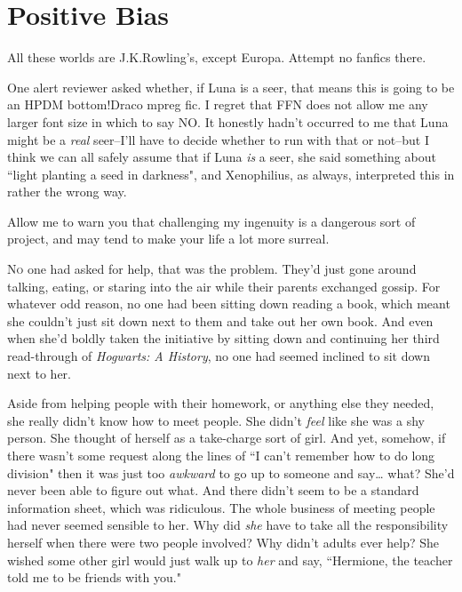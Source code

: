\chapter{Positive Bias}

\begin{chapterOpeningAuthorNote}
All these worlds are J.\?K.\?Rowling's, except Europa. Attempt no fanfics there.

One alert reviewer asked whether, if Luna is a seer, that means this is going to be an HPDM bottom!Draco mpreg fic. I regret that FFN does not allow me any larger font size in which to say NO. It honestly hadn't occurred to me that Luna might be a \emph{real} seer\---I'll have to decide whether to run with that or not\---but I think we can all safely assume that if Luna \emph{is} a seer, she said something about ``light planting a seed in darkness", and Xenophilius, as always, interpreted this in rather the wrong way.
\end{chapterOpeningAuthorNote}
\begin{chapterOpeningQuote}
Allow me to warn you that challenging my ingenuity is a dangerous sort of project, and may tend to make your life a lot more surreal.
\end{chapterOpeningQuote}

\lettrine{N}{o} one had asked for help, that was the problem. They'd just gone around talking, eating, or staring into the air while their parents exchanged gossip. For whatever odd reason, no one had been sitting down reading a book, which meant she couldn't just sit down next to them and take out her own book. And even when she'd boldly taken the initiative by sitting down and continuing her third read-through of \emph{Hogwarts: A History}, no one had seemed inclined to sit down next to her.

Aside from helping people with their homework, or anything else they needed, she really didn't know how to meet people. She didn't \emph{feel} like she was a shy person. She thought of herself as a take-charge sort of girl. And yet, somehow, if there wasn't some request along the lines of ``I can't remember how to do long division" then it was just too \emph{awkward} to go up to someone and say{\ldots} what? She'd never been able to figure out what. And there didn't seem to be a standard information sheet, which was ridiculous. The whole business of meeting people had never seemed sensible to her. Why did \emph{she} have to take all the responsibility herself when there were two people involved? Why didn't adults ever help? She wished some other girl would just walk up to \emph{her} and say, ``Hermione, the teacher told me to be friends with you."

